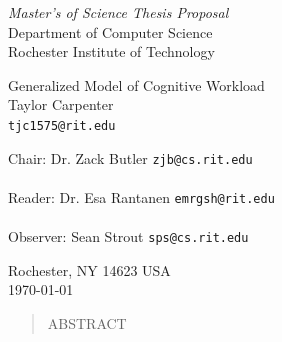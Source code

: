 \documentclass[11pt]{article}
\begin{document}
\thispagestyle{empty}
\begin{center}
\begin{Large}
\emph{Master's of Science Thesis Proposal} \\
Department of Computer Science \\
Rochester Institute of Technology \\
\end{Large}
\vspace{4em}
{\huge Generalized Model of Cognitive Workload} \\
\vspace{3em}
{\LARGE Taylor Carpenter} \\
{\tt tjc1575@rit.edu} \\
\vspace{3em}
\begin{adjustwidth}{.5in}{.5in}
Chair: Dr. Zack Butler \hfill {\tt zjb@cs.rit.edu} \\
\vspace{2em}
\hrulefill \\
\vspace{3em}
Reader: Dr. Esa Rantanen \hfill {\tt emrgsh@rit.edu} \\
\vspace{2em}
\hrulefill \\
\vspace{3em}
Observer: Sean Strout \hfill {\tt sps@cs.rit.edu} \\
\vspace{2em}
\hrulefill
\end{adjustwidth}
\vspace{2em}
Rochester, NY 14623 USA \\
\vspace{2em}
\today
\end{center}
\pagebreak
\thispagestyle{empty}
\begin{abstract}
ABSTRACT
\end{abstract}
\clearpage
{}
\tableofcontents
\listoffigures
\listoftables
\pagebreak
\end{document}
